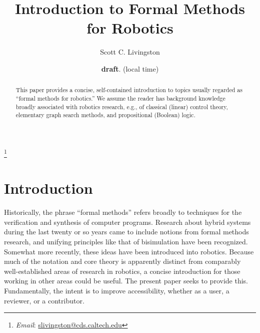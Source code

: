 \documentclass{amsart}
\theoremstyle{plain}
\theoremstyle{definition}
\theoremstyle{definition}
\begin{document}
\title{Introduction to Formal Methods for Robotics}
\author{Scott C. Livingston}
\thanks{\textit{Email}: \href{mailto:slivingston@cds.caltech.edu}{slivingston@cds.caltech.edu}}
\date{\textbf{draft}. \now{} (local time)}
\begin{abstract}
This paper provides a concise, self-contained introduction to 
topics usually regarded as ``formal methods for robotics.''  We assume the reader
has background knowledge broadly associated with robotics research, e.g., of
classical (linear) control theory, elementary graph search methods, and
propositional (Boolean) logic.
\end{abstract}
\maketitle

\section{Introduction}\label{sec:intro}

Historically, the phrase ``formal methods'' refers broadly to techniques for the
verification and synthesis of computer programs.  Research about hybrid systems
during the last twenty or so years came to include notions from formal methods
research, and unifying principles like that of bisimulation have been
recognized.  Somewhat more recently, these ideas have been introduced into
robotics.  Because much of the notation and core theory is apparently distinct
from comparably well-established areas of research in robotics, a concise
introduction for those working in other areas could be useful.  The present
paper seeks to provide this.  Fundamentally, the intent is to improve
accessibility, whether as a user, a reviewer, or a contributor.

\end{document}
